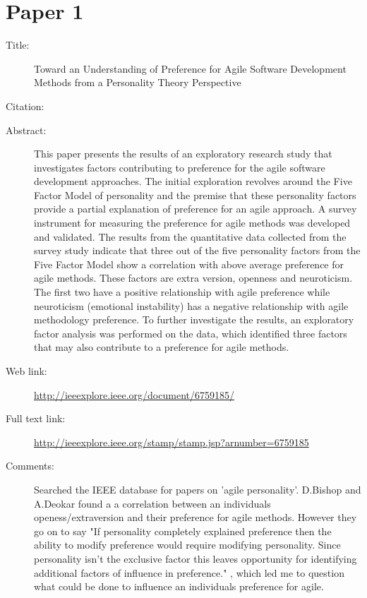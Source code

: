 \documentclass{scrartcl}
\begin{document}
\section*{Paper 1}
\begin{description}
\item[Title:] Toward an Understanding of Preference for Agile Software Development Methods from a Personality Theory Perspective
\item[Citation:] \cite{Paper1}
\item[Abstract:] This paper presents the results of an exploratory research study that investigates factors contributing to preference for the agile software development approaches. The initial exploration revolves around the Five Factor Model of personality and the premise that these personality factors provide a partial explanation of preference for an agile approach. A survey instrument for measuring the preference for agile methods was developed and validated. The results from the quantitative data collected from the survey study indicate that three out of the five personality factors from the Five Factor Model show a correlation with above average preference for agile methods. These factors are extra version, openness and neuroticism. The first two have a positive relationship with agile preference while neuroticism (emotional instability) has a negative relationship with agile methodology preference. To further investigate the results, an exploratory factor analysis was performed on the data, which identified three factors that may also contribute to a preference for agile methods.
\item[Web link:] \url{http://ieeexplore.ieee.org/document/6759185/}
\item[Full text link:] \url{http://ieeexplore.ieee.org/stamp/stamp.jsp?arnumber=6759185}
\item[Comments:] Searched the IEEE database for papers on 'agile personality'. D.Bishop and A.Deokar found a a correlation between an individuals openess/extraversion and their preference for agile methods. However they go on to say "If personality completely explained preference then the ability to modify preference would require modifying personality. Since personality isn't the exclusive factor this leaves opportunity for identifying additional factors of influence in preference." \cite{Paper1}, which led me to question what could be done to influence an individuals preference for agile.
\end{description}
\end{document}
